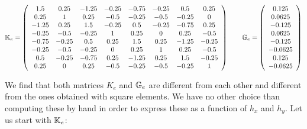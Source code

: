 \[
{\mathbb{K}}_e=
\left(
\begin{array}{cccccccc}
 1.5&  0.25& -1.25& -0.25& -0.75& -0.25&  0.5&  0.25\\
 0.25&  1&  0.25& -0.5& -0.25& -0.5& -0.25&  0\\
-1.25&  0.25&  1.5& -0.25&  0.5& -0.25& -0.75&  0.25\\
-0.25& -0.5& -0.25&  1&  0.25&  0&  0.25& -0.5\\
-0.75& -0.25&  0.5&  0.25&  1.5&  0.25& -1.25& -0.25\\
-0.25& -0.5& -0.25&  0&  0.25&  1&  0.25& -0.5\\
 0.5& -0.25& -0.75&  0.25& -1.25&  0.25&  1.5& -0.25\\
 0.25& 0&  0.25& -0.5& -0.25& -0.5& -0.25&  1
\end{array}
\right)
\qquad
{\mathbb{G}}_e = 
\left(
\begin{array}{c}
 0.125\\
 0.0625\\
-0.125\\
 0.0625\\
-0.125\\
-0.0625\\
 0.125\\
-0.0625
\end{array}
\right)
\]

We find that both matrices $K_e$ and ${\mathbb{G}}_e$ are different from each 
other and different from the ones obtained with square elements. We have 
no other choice than computing these by hand in order to express these as 
a function of $h_x$ and $h_y$. Let us start with ${\mathbb{K}}_e$:

